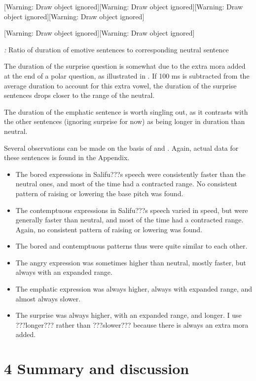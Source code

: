 \documentclass[output=paper]{langsci/langscibook}
\begin{document}
[Warning: Draw object ignored][Warning: Draw object ignored][Warning: Draw object ignored][Warning: Draw object ignored]

[Warning: Draw object ignored][Warning: Draw object ignored]

\emph{\textup{:}} Ratio of duration of emotive sentences to corresponding neutral sentence

The duration of the surprise question is somewhat due to the extra mora added at the end of a polar question, as illustrated in . If 100 ms is subtracted from the average duration to account for this extra vowel, the duration of the surprise sentences drops closer to the range of the neutral. 

The duration of the emphatic sentence is worth singling out, as it contrasts with the other sentences (ignoring surprise for now) as being longer in duration than neutral. 

Several observations can be made on the basis of  and . Again, actual data for these sentences is found in the Appendix.

\begin{itemize}
\item The bored expressions in Salifu???s speech were consistently faster than the neutral ones, and most of the time had a contracted range. No consistent pattern of raising or lowering the base pitch was found.
\item The contemptuous expressions in Salifu???s speech varied in speed, but were generally faster than neutral, and most of the time had a contracted range. Again, no consistent pattern of raising or lowering was found.
\item The bored and contemptuous patterns thus were quite similar to each other.
\item The angry expression was sometimes higher than neutral, mostly faster, but always with an expanded range.
\item The emphatic expression was always higher, always with expanded range, and almost always slower.
\item The surprise was always higher, with an expanded range, and longer. I use ???longer??? rather than ???slower??? because there is always an extra mora added.
\end{itemize}
\chapter{4 Summary and discussion}
\end{document}

